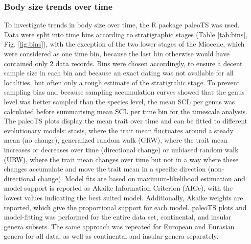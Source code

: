 \subsubsection{Body size trends over time}
To investigate trends in body size over time, the R package paleoTS \citep{Hunt2015a} was used. Data were split into time bins according to stratigraphic stages (Table \ref{tab:bins}, Fig. \ref{fig:bins}), with the exception of the two lower stages of the Miocene, which were considered as one time bin, because the last bin otherwise would have contained only 2 data records. Bins were chosen accordingly, to ensure a decent sample size in each bin and because an exact dating was not available for all localities, but often only a rough estimate of the stratigrahic stage.
To prevent sampling bias and because sampling accumulation curves showed that the genus level was better sampled than the species level, the mean SCL per genus was calculated before summarising mean SCL per time bin for the timescale analysis. The paleoTS plots display the mean trait over time and can be fitted to different evolutionary models: stasis, where the trait mean fluctuates around a steady mean (no change), generalized random walk (GRW), where the trait mean increases or decreases over time (directional change) or unbiased random walk (URW), where the trait mean changes over time but not in a way where these changes accumulate and move the trait mean in a specific direction (non-directional change). Model fits are based on maximum-likelihood estimation and model support is reported as Akaike Information Criterion (AICc), with the lowest values indicating the best suited model. Additionally, Akaike weights are reported, which give the proportional support for each model. paleoTS plots and model-fitting was performed for the entire data set, continental, and insular genera subsets. The same approach was repeated for European and Eurasian genera for all data, as well as continental and insular genera separately.

